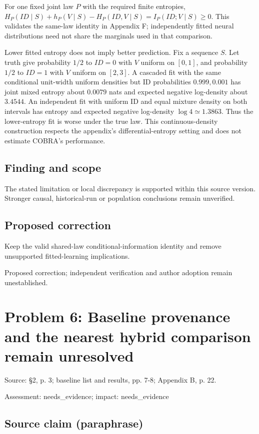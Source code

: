 \documentclass[11pt]{article}
\begin{document}
For one fixed joint law \(P\) with the required finite entropies, \(H_P(ID\mid S)+h_P(V\mid S)-H_P(ID,V\mid S)=I_P(ID;V\mid S)\ge0\). This validates the same-law identity in Appendix F; independently fitted neural distributions need not share the marginals used in that comparison.

Lower fitted entropy does not imply better prediction. Fix a sequence \(S\). Let truth give probability \(1/2\) to \(ID=0\) with \(V\) uniform on \([0,1]\), and probability \(1/2\) to \(ID=1\) with \(V\) uniform on \([2,3]\). A cascaded fit with the same conditional unit-width uniform densities but ID probabilities \(0.999,0.001\) has joint mixed entropy about \(0.0079\) nats and expected negative log-density about \(3.4544\). An independent fit with uniform ID and equal mixture density on both intervals has entropy and expected negative log-density \(\log4\simeq1.3863\). Thus the lower-entropy fit is worse under the true law. This continuous-density construction respects the appendix’s differential-entropy setting and does not estimate COBRA’s performance.

\subsection*{Finding and scope}

The stated limitation or local discrepancy is supported within this source version. Stronger causal, historical-run or population conclusions remain unverified.

\subsection*{Proposed correction}

Keep the valid shared-law conditional-information identity and remove unsupported fitted-learning implications.

Proposed correction; independent verification and author adoption remain unestablished.

\section*{Problem 6: Baseline provenance and the nearest hybrid comparison remain unresolved}

Source: §2, p. 3; baseline list and results, pp. 7-8; Appendix B, p. 22.

Assessment: needs\_evidence; impact: needs\_evidence

\subsection*{Source claim (paraphrase)}
\end{document}

